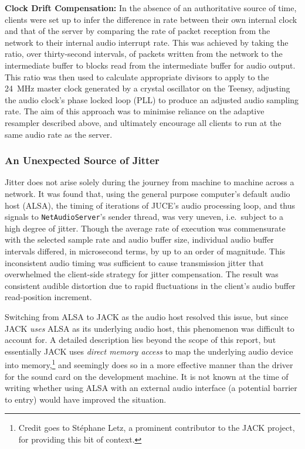 \textbf{Clock Drift Compensation:}
In the absence of an authoritative source of time, clients were set up to infer
the difference in rate between their own internal clock and that of the server
by comparing the rate of packet reception from the network to their internal
audio interrupt rate.
This was achieved by taking the ratio, over thirty-second intervals, of
packets written from the network to the intermediate buffer to blocks read
from the intermediate buffer for audio output.
This ratio was then used to calculate appropriate divisors to apply to the
\qty{24}{\MHz} master clock generated by a crystal oscillator on the Teensy,
adjusting the audio clock's phase locked loop (PLL) to produce an adjusted audio
sampling rate.
The aim of this approach was to minimise reliance on the adaptive resampler
described above, and ultimately encourage all clients to run at the same audio
rate as the server.

\subsubsection{An Unexpected Source of Jitter}

Jitter does not arise solely during the journey from machine to machine across
a network.
It was found that, using the general purpose computer's default audio host
(ALSA), the timing of iterations of JUCE's audio processing loop, and thus
signals to \texttt{NetAudioServer}'s sender thread, was very uneven, i.e.\
subject to a high degree of jitter.
Though the average rate of execution was commensurate with the selected sample
rate and audio buffer size, individual audio buffer intervals differed, in
microsecond terms, by up to an order of magnitude. This inconsistent audio
timing was sufficient to cause transmission jitter that overwhelmed
the client-side strategy for jitter compensation.
The result was consistent audible distortion due to rapid fluctuations in the
client's audio buffer read-position increment.

Switching from ALSA to JACK as the audio host resolved this issue, but since
JACK \textit{uses} ALSA as its underlying audio host, this phenomenon was
difficult to account for.
A detailed description lies beyond the scope of this report, but
essentially JACK uses \textit{direct memory access} to map the underlying audio
device into memory,\footnote{
    Credit goes to Stéphane Letz, a prominent contributor to the JACK project,
    for providing this bit of context.
} and seemingly does so in a more effective manner than the driver
for the sound card on the development machine.
It is not known at the time of writing whether using ALSA with an external audio
interface (a potential barrier to entry) would have improved the situation.

